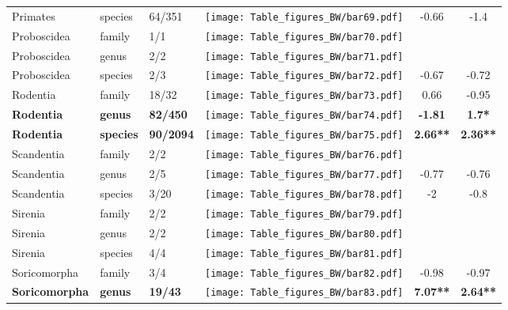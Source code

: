 \begin{longtable}{lL{1.8cm}C{2cm}lcc}
  Primates & species & 64/351 & \texttt{[image: Table\_figures\_BW/bar69.pdf]} & -0.66 & -1.4 \\ 
  Proboscidea & family & 1/1 & \texttt{[image: Table\_figures\_BW/bar70.pdf]} &   &   \\ 
  Proboscidea & genus & 2/2 & \texttt{[image: Table\_figures\_BW/bar71.pdf]} &   &   \\ 
  Proboscidea & species & 2/3 & \texttt{[image: Table\_figures\_BW/bar72.pdf]} & -0.67 & -0.72 \\ 
  Rodentia & family & 18/32 & \texttt{[image: Table\_figures\_BW/bar73.pdf]} & 0.66 & -0.95 \\ 
  \textbf{Rodentia} & \textbf{genus} & \textbf{82/450} & \texttt{[image: Table\_figures\_BW/bar74.pdf]} & \textbf{-1.81} & \textbf{1.7*} \\ 
  \textbf{Rodentia} & \textbf{species} & \textbf{90/2094} & \texttt{[image: Table\_figures\_BW/bar75.pdf]} & \textbf{2.66**} & \textbf{2.36**} \\ 
  Scandentia & family & 2/2 & \texttt{[image: Table\_figures\_BW/bar76.pdf]} &   &   \\ 
  Scandentia & genus & 2/5 & \texttt{[image: Table\_figures\_BW/bar77.pdf]} & -0.77 & -0.76 \\ 
  Scandentia & species & 3/20 & \texttt{[image: Table\_figures\_BW/bar78.pdf]} & -2 & -0.8 \\ 
  Sirenia & family & 2/2 & \texttt{[image: Table\_figures\_BW/bar79.pdf]} &   &   \\ 
  Sirenia & genus & 2/2 & \texttt{[image: Table\_figures\_BW/bar80.pdf]} &   &   \\ 
  Sirenia & species & 4/4 & \texttt{[image: Table\_figures\_BW/bar81.pdf]} &   &   \\ 
  Soricomorpha & family & 3/4 & \texttt{[image: Table\_figures\_BW/bar82.pdf]} & -0.98 & -0.97 \\ 
  \textbf{Soricomorpha} & \textbf{genus} & \textbf{19/43} & \texttt{[image: Table\_figures\_BW/bar83.pdf]} & \textbf{7.07**} & \textbf{2.64**} \\ 

\end{longtable}
